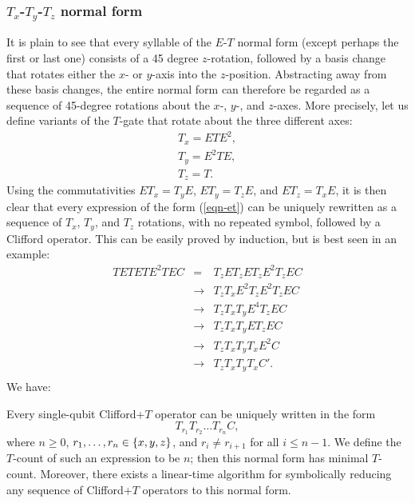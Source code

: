 \subsubsection{$T_x$-$T_y$-$T_z$ normal form} %
\label{ssub:_t_x_t_y_t_z_normal_form}
It is plain to see that every syllable of the $E$-$T$ normal form (except perhaps the first or last
one) consists of a 45 degree $z$-rotation, followed by a basis change that rotates either the $x$-
or $y$-axis into the $z$-position. Abstracting away from these basis changes, the entire normal
form can therefore be regarded as a sequence of 45-degree rotations about the $x$-, $y$-, and
$z$-axes. More precisely, let us define variants of the $T$-gate that rotate about the three
different axes:
\[
 \begin{array}{l}
    T_x = ETE^2, \\
    T_y = E^2TE, \\
    T_z = T.
  \end{array}
\]
Using the commutativities $ET_x = T_yE$, $ET_y = T_zE$, and $ET_z = T_xE$, it is then clear that
every expression of the form (\vref{eqn-et}) can be uniquely rewritten as a sequence of $T_x$,
$T_y$, and $T_z$ rotations, with no repeated symbol, followed by a Clifford operator. This can be
easily proved by induction, but is best seen in an example:
\[
  \begin{array}{rcl}
    TETETE^2TEC
    &=& T_zET_zET_zE^2T_zEC \\
    &\rightarrow& T_zT_xE^2T_zE^2T_zEC \\
    &\rightarrow& T_zT_xT_yE^4T_zEC \\
    &\rightarrow& T_zT_xT_yET_zEC \\
    &\rightarrow& T_zT_xT_yT_xE^2C \\
    &\rightarrow& T_zT_xT_yT_xC'. \\
  \end{array}
\]
We have:
\begin{proposition}
  Every single-qubit Clifford+$T$ operator can be uniquely written in the form
  \[
    T_{r_1}T_{r_2}\ldots T_{r_n} C,
  \]
  where $n\geq 0$, $r_1,\ldots,r_n\in\{x,y,z\}$, and $r_i\neq r_{i+1}$ for all $i\leq n-1$. We
  define the $T$-count of such an expression to be $n$; then this normal form has minimal
  $T$-count. Moreover, there exists a linear-time algorithm for symbolically reducing any sequence
  of Clifford+$T$ operators to this normal form.
\end{proposition}

